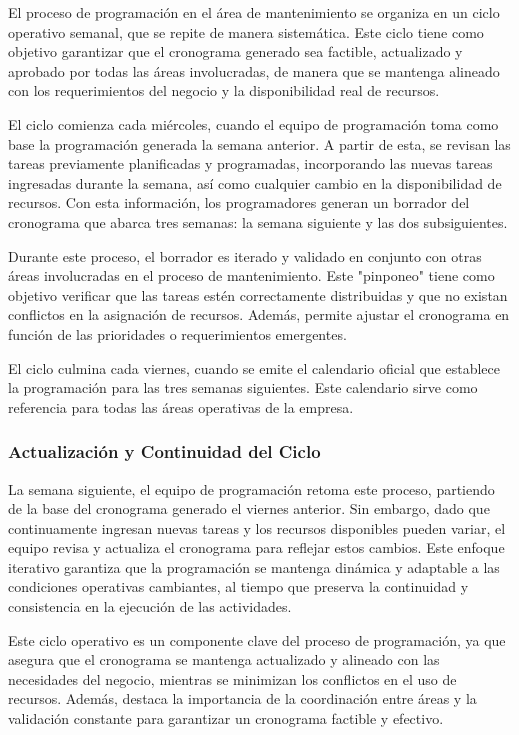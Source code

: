 \documentclass{article}
\begin{document}
El proceso de programación en el área de mantenimiento se organiza en un ciclo operativo semanal, que se repite de manera sistemática. Este ciclo tiene como objetivo garantizar que el cronograma generado sea factible, actualizado y aprobado por todas las áreas involucradas, de manera que se mantenga alineado con los requerimientos del negocio y la disponibilidad real de recursos.

El ciclo comienza cada miércoles, cuando el equipo de programación toma como base la programación generada la semana anterior. A partir de esta, se revisan las tareas previamente planificadas y programadas, incorporando las nuevas tareas ingresadas durante la semana, así como cualquier cambio en la disponibilidad de recursos. Con esta información, los programadores generan un borrador del cronograma que abarca tres semanas: la semana siguiente y las dos subsiguientes.

Durante este proceso, el borrador es iterado y validado en conjunto con otras áreas involucradas en el proceso de mantenimiento. Este "pinponeo" tiene como objetivo verificar que las tareas estén correctamente distribuidas y que no existan conflictos en la asignación de recursos. Además, permite ajustar el cronograma en función de las prioridades o requerimientos emergentes.

El ciclo culmina cada viernes, cuando se emite el calendario oficial que establece la programación para las tres semanas siguientes. Este calendario sirve como referencia para todas las áreas operativas de la empresa.

\subsubsection{Actualización y Continuidad del Ciclo}

La semana siguiente, el equipo de programación retoma este proceso, partiendo de la base del cronograma generado el viernes anterior. Sin embargo, dado que continuamente ingresan nuevas tareas y los recursos disponibles pueden variar, el equipo revisa y actualiza el cronograma para reflejar estos cambios. Este enfoque iterativo garantiza que la programación se mantenga dinámica y adaptable a las condiciones operativas cambiantes, al tiempo que preserva la continuidad y consistencia en la ejecución de las actividades.

Este ciclo operativo es un componente clave del proceso de programación, ya que asegura que el cronograma se mantenga actualizado y alineado con las necesidades del negocio, mientras se minimizan los conflictos en el uso de recursos. Además, destaca la importancia de la coordinación entre áreas y la validación constante para garantizar un cronograma factible y efectivo.
\end{document}

